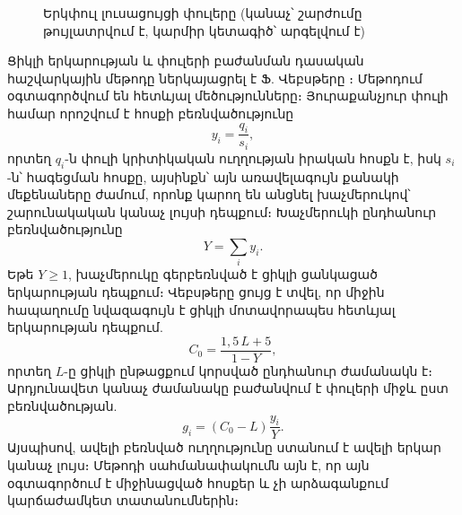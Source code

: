 \documentclass[12pt,a4paper]{extreport}
\begin{document}
\begin{figure}[ht]
\centering
{}
\caption{Երկփուլ լուսացույցի փուլերը (կանաչ՝ շարժումը թույլատրվում է, կարմիր կետագիծ՝ արգելվում է)}
\label{fig:phases}
\end{figure}

Ցիկլի երկարության և փուլերի բաժանման դասական հաշվարկային մեթոդը ներկայացրել է Ֆ. Վեբսթերը \cite{webster1958}։ Մեթոդում օգտագործվում են հետևյալ մեծությունները։ Յուրաքանչյուր փուլի համար որոշվում է հոսքի բեռնվածությունը
\begin{equation}
  y_i = \frac{q_i}{s_i},
\end{equation}
որտեղ $q_i$-ն փուլի կրիտիկական ուղղության իրական հոսքն է, իսկ $s_i$-ն՝ հագեցման հոսքը, այսինքն՝ այն առավելագույն քանակի մեքենաները ժամում, որոնք կարող են անցնել խաչմերուկով՝ շարունակական կանաչ լույսի դեպքում։ Խաչմերուկի ընդհանուր բեռնվածությունը
\begin{equation}
  Y = \sum_i y_i .
\end{equation}
Եթե $Y \ge 1$, խաչմերուկը գերբեռնված է ցիկլի ցանկացած երկարության դեպքում։ Վեբսթերը ցույց է տվել, որ միջին հապաղումը նվազագույն է ցիկլի մոտավորապես հետևյալ երկարության դեպքում.
\begin{equation}
  C_0 = \frac{1{,}5\,L + 5}{1 - Y},
\end{equation}
որտեղ $L$-ը ցիկլի ընթացքում կորսված ընդհանուր ժամանակն է։ Արդյունավետ կանաչ ժամանակը բաժանվում է փուլերի միջև ըստ բեռնվածության.
\begin{equation}
  g_i = \left(C_0 - L\right)\frac{y_i}{Y}.
\end{equation}
Այսպիսով, ավելի բեռնված ուղղությունը ստանում է ավելի երկար կանաչ լույս։ Մեթոդի սահմանափակումն այն է, որ այն օգտագործում է միջինացված հոսքեր և չի արձագանքում կարճաժամկետ տատանումներին։
\end{document}
